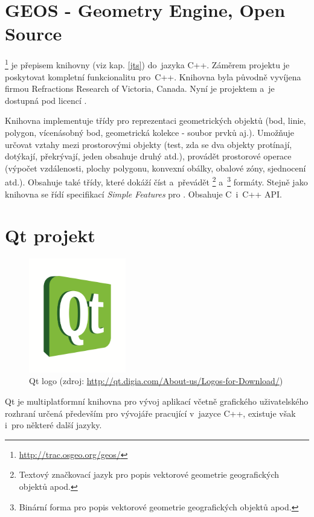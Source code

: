\section{GEOS - Geometry Engine, Open Source}
\label{geos}

\footnote{\url{http://trac.osgeo.org/geos/}}  je přepisem 
knihovny  (viz kap. \ref{jts}) do~jazyka C++. Záměrem 
projektu je poskytovat kompletní funkcionalitu  pro~C++. Knihovna 
byla původně vyvíjena firmou Refractions Research of Victoria, Canada. Nyní 
je projektem  a~je dostupná pod licencí .

Knihovna  implementuje třídy pro reprezentaci geometrických
objektů (bod, linie, polygon, vícenásobný bod, geometrická kolekce
- soubor prvků aj.). Umožňuje určovat vztahy mezi prostorovými objekty 
(test, zda se dva objekty protínají, dotýkají, překrývají, jeden obsahuje 
druhý atd.), provádět prostorové operace (výpočet vzdálenosti, plochy 
polygonu, konvexní obálky, obalové zóny, sjednocení atd.). Obsahuje také 
třídy, které dokáží číst a~převádět \footnote{Textový 
značkovací jazyk pro popis vektorové geometrie geografických objektů 
apod.} a~\footnote{Binární forma pro popis vektorové 
geometrie geografických objektů apod.} formáty. Stejně jako knihovna 
 se řídí specifikací \textit{Simple Features} pro .
Obsahuje C~i~C++ API.

\section{Qt projekt}
\label{qt}

  \begin{figure}[hbt]
    \centering
      \includegraphics[width=120pt]{./pictures/qt.png}
      \caption[Qt logo]{Qt logo 
	(zdroj: \url{http://qt.digia.com/About-us/Logos-for-Download/})}
      \label{fig:qt}
  \end{figure}

Qt je multiplatformní knihovna pro vývoj aplikací včetně grafického 
uživatelského rozhraní určená především pro vývojáře pracující 
v~jazyce C++, existuje však i~pro některé další jazyky.

